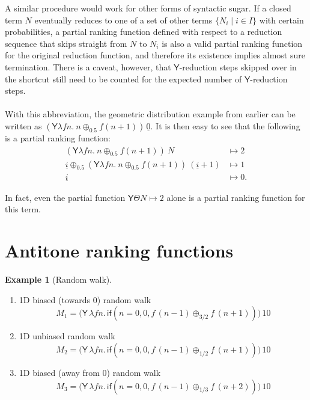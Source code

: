 \documentclass{article}
\newcommand{\tY}{\mathsf{Y}}
\newcommand{\tif}[3]{\mathsf{if}(#1, #2, #3)} %
\theoremstyle{definition}
\newtheorem{example}{Example}
\theoremstyle{lemma}
\theoremstyle{remark}
\begin{document}
A similar procedure would work for other forms of syntactic sugar. If a closed term $N$ eventually reduces to one of a set of other terms $\{N_i \mid i \in I\}$ with certain probabilities, a partial ranking function defined with respect to a reduction sequence that skips straight from $N$ to $N_i$ is also a valid partial ranking function for the original reduction function, and therefore its existence implies almost sure termination. There is a caveat, however, that $\tY$-reduction steps skipped over in the shortcut still need to be counted for the expected number of $\tY$-reduction steps.

\paragraph{}
With this abbreviation, the geometric distribution example from earlier can be written as $(\tY \lambda f n.\ n \oplus_{0.5} f(n+1)) \, \underline 0$. It is then easy to see that the following is a partial ranking function:
\begin{align*}
(\tY \lambda f n.\ n \oplus_{0.5} f(n+1))\ N & \mapsto 2 \\
\underline i \oplus_{0.5} (\tY \lambda f n.\ n \oplus_{0.5} f(n+1))\ (\underline i + 1) & \mapsto 1 \\
\underline i & \mapsto 0.
\end{align*}

In fact, even the partial function $\tY \Theta N \mapsto 2$ alone is a partial ranking function for this term.
\section{Antitone ranking functions}

\begin{example}[Random walk]
\label{ex:ac-ranking}
\begin{enumerate}
\item 1D biased (towards 0) random walk
\[
M_1 = 
\big(\tY \, \lambda f n . \, 
\tif{n = 0}{0}{f \, (n - 1) \oplus_{3/2} f \, (n + 1)}\big) \, 10
\]

\item 1D unbiased random walk
\[
M_2 = 
\big(\tY \, \lambda f n . \, 
\tif{n = 0}{0}{f \, (n - 1) \oplus_{1/2} f \, (n + 1)}\big) \, 10
\]

\item 1D biased (away from 0) random walk
\[
M_3 = 
\big(\tY \, \lambda f n . \, 
\tif{n = 0}{0}{f \, (n - 1) \oplus_{1/3} f \, (n + 2)}\big) \, 10
\]



\end{enumerate}
\end{example}
\end{document}
